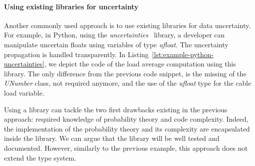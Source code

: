 \paragraph{Using existing libraries for uncertainty}
%
%
Another commonly used approach is to use existing libraries for data uncertainty.
For example, in Python, using the \textit{uncertainties}~\cite{url:uncertainties} library, a developer can manipulate uncertain floats using variables of type \textit{ufloat}.
The uncertainty propagation is handled transparently.
In Listing~\ref{lst:example-python-uncertainties}, we depict the code of the load average computation using this library.
The only difference from the previous code snippet, is the missing of the \textit{UNumber} class, not required anymore, and the use of the \textit{ufloat} type for the cable load variable.

Using a library can tackle the two first drawbacks existing in the previous approach: required knowledge of probability theory and code complexity.
Indeed, the implementation of the probability theory and its complexity are encapsulated inside the library.
We can argue that the library will be well tested and documented.
However, similarly to the previous example, this approach does not extend the type system.

